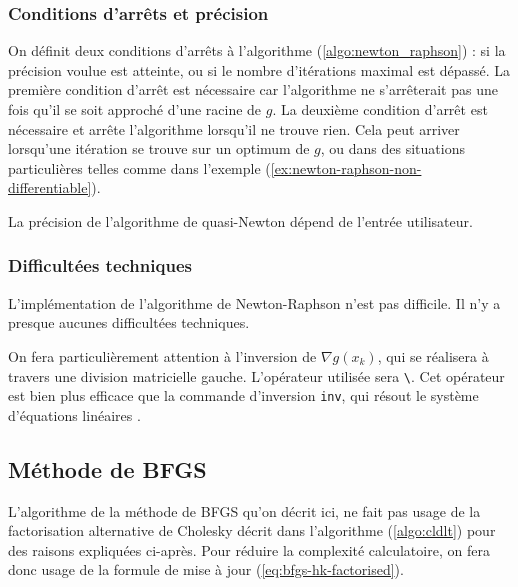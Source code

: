 \documentclass[3p, twocolumn]{elsarticle}
\begin{document}
\subsubsection{Conditions d'arrêts et précision}
On définit deux conditions d'arrêts à l'algorithme (\ref{algo:newton_raphson}) : si la précision voulue est atteinte, ou si le nombre d'itérations maximal est dépassé. La première condition d'arrêt est nécessaire car l'algorithme ne s'arrêterait pas une fois qu'il se soit approché d'une racine de $g$. La deuxième condition d'arrêt est nécessaire et arrête l'algorithme lorsqu'il ne trouve rien. Cela peut arriver lorsqu'une itération se trouve sur un optimum de $g$, ou dans des situations particulières telles comme dans l'exemple (\ref{ex:newton-raphson-non-differentiable}).

La précision de l'algorithme de quasi-Newton dépend de l'entrée utilisateur.

\subsubsection{Difficultées techniques}
L'implémentation de l'algorithme de Newton-Raphson n'est pas difficile. Il n'y a presque aucunes difficultées techniques.

On fera particulièrement attention à l'inversion de $\nabla g(x_k)$, qui se réalisera à travers une division matricielle gauche. L'opérateur utilisée sera \texttt{\textbackslash}. Cet opérateur est bien plus efficace que la commande d'inversion \texttt{inv}, qui résout le système d'équations linéaires \cite{doc:scilab-backslash}.

\subsection{Méthode de BFGS}
L'algorithme de la méthode de BFGS qu'on décrit ici, ne fait pas usage de la factorisation alternative de Cholesky décrit dans l'algorithme (\ref{algo:cldlt}) pour des raisons expliquées ci-après. Pour réduire la complexité calculatoire, on fera donc usage de la formule de mise à jour (\ref{eq:bfgs-hk-factorised}).
\end{document}

